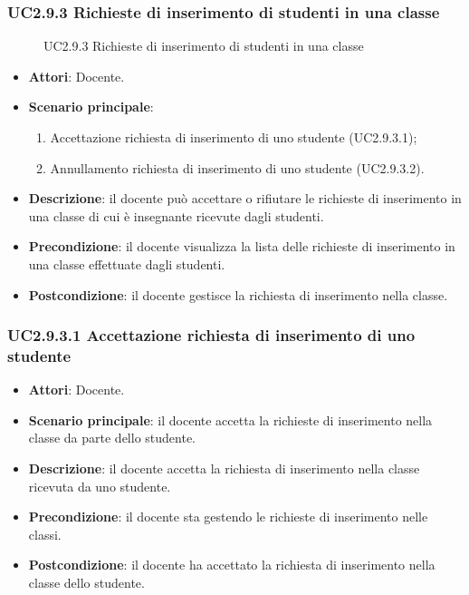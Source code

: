 \subsubsection{UC2.9.3 Richieste di inserimento di studenti in una classe}
\begin{figure}[H]
\centering
\noindent{}
\caption{UC2.9.3 Richieste di inserimento di studenti in una classe}
\end{figure}
\begin{itemize}
\item \textbf{Attori}: Docente.
\item \textbf{Scenario principale}:
\begin{enumerate}
\item Accettazione richiesta di inserimento di uno studente (UC2.9.3.1);
\item Annullamento richiesta di inserimento di uno studente (UC2.9.3.2).
\end{enumerate}
\item \textbf{Descrizione}: il docente può accettare o rifiutare le richieste di inserimento in una classe di cui è insegnante ricevute dagli studenti.
\item \textbf{Precondizione}: il docente visualizza la lista delle richieste di inserimento in una classe effettuate dagli studenti.
\item \textbf{Postcondizione}: il docente gestisce la richiesta di inserimento nella classe.
\end{itemize}
\subsubsection{UC2.9.3.1 Accettazione richiesta di inserimento di uno studente}
\begin{itemize}
\item \textbf{Attori}: Docente.
\item \textbf{Scenario principale}: il docente accetta la richieste di inserimento nella classe da parte dello studente.
\item \textbf{Descrizione}: il docente accetta la richiesta di inserimento nella classe ricevuta da uno studente.
\item \textbf{Precondizione}: il docente sta gestendo le richieste di inserimento nelle classi.
\item \textbf{Postcondizione}: il docente ha accettato la richiesta di inserimento nella classe dello studente.
\end{itemize}
